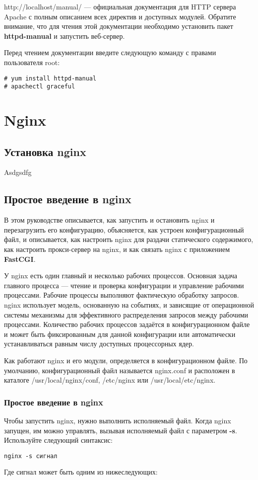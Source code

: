 \documentclass[a4paper,10pt,twoside]{article}
\begin{document}
http://localhost/manual/ — официальная документация для HTTP сервера Apache с полным описанием всех директив и доступных модулей. Обратите внимание, что для чтения этой документации необходимо установить пакет \textbf{httpd-manual} и запустить веб-сервер.

Перед чтением документации введите следующую команду с правами пользователя root: 
\begin{verbatim}
# yum install httpd-manual
# apachectl graceful
\end{verbatim} 

\section{Nginx}
\subsection{Установка nginx}

Asdgsdfg

\subsection{Простое введение в nginx}
В этом руководстве описывается, как запустить и остановить nginx и перезагрузить его конфигурацию, объясняется, как устроен конфигурационный файл, и описывается, как настроить nginx для раздачи статического содержимого, как настроить прокси-сервер на nginx, и как связать nginx с приложением \textbf{FastCGI}.

У nginx есть один главный и несколько рабочих процессов. Основная задача главного процесса — чтение и проверка конфигурации и управление рабочими процессами. Рабочие процессы выполняют фактическую обработку запросов. nginx использует модель, основанную на событиях, и зависящие от операционной системы механизмы для эффективного распределения запросов между рабочими процессами. Количество рабочих процессов задаётся в конфигурационном файле и может быть фиксированным для данной конфигурации или автоматически устанавливаться равным числу доступных процессорных ядер.

Как работают nginx и его модули, определяется в конфигурационном файле. По умолчанию, конфигурационный файл называется nginx.conf и расположен в каталоге /usr/local/nginx/conf, /etc/nginx или /usr/local/etc/nginx.

\subsubsection{Простое введение в nginx}
Чтобы запустить nginx, нужно выполнить исполняемый файл. Когда nginx запущен, им можно управлять, вызывая исполняемый файл с параметром \textbf{-s}. Используйте следующий синтаксис:
\begin{verbatim}
nginx -s сигнал
\end{verbatim} 
Где сигнал может быть одним из нижеследующих:
\end{document}
